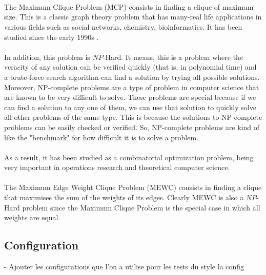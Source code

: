     \\ \\ \\
    The Maximum Clique Problem (MCP) consists in finding a clique of maximum size. This is a classic graph theory problem that has many-real life applications in various fields such as social networks, chemistry, bioinformatics. It has been studied since the early 1990s \cite{mewcf}.
    \\ \\
    In addition, this problem is $NP$-Hard. It means, this is a problem where the veracity of any solution can be verified quickly (that is, in polynomial time) and a brute-force search algorithm can find a solution by trying all possible solutions. Moreover, NP-complete problems are a type of problem in computer science that are known to be very difficult to solve. These problems are special because if we can find a solution to any one of them, we can use that solution to quickly solve all other problems of the same type. This is because the solutions to NP-complete problems can be easily checked or verified. So, NP-complete problems are kind of like the "benchmark" for how difficult it is to solve a problem. 
    \\ \\
    As a result, it has been studied as a combinatorial optimization problem, being very important in operations research and theoretical computer science.
    \\ \\
    The Maximum Edge Weight Clique Problem (MEWC) consists in finding a clique that maximises the sum of the weights of its edges. Clearly MEWC is also a $NP$-Hard problem since the Maximum Clique Problem is the special case in which all weights are equal.


\subsection{Configuration}

    -  Ajouter les configurations que l'on a utilise pour les tests du style la config\\ \\

